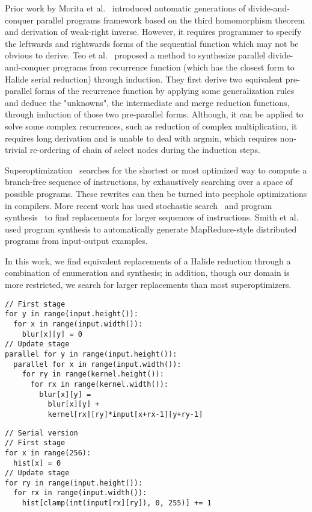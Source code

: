 Prior work by Morita et al.~\cite{Morita:2007:AIG:1250734.1250752} introduced automatic generations of divide-and-conquer parallel programs framework based on the third homomorphism theorem and derivation of weak-right inverse. However, it requires programmer to specify the leftwards and rightwards forms of the sequential function which may not be obvious to derive. Teo et al.~\cite{Teo:1997:DEP:266670.266697} proposed a method to synthesize parallel divide-and-conquer
programs from recurrence function (which has the closest form to Halide serial reduction) through induction. They first derive two equivalent pre-parallel forms of the recurrence function by applying some generalization rules and deduce the "unknowns", the intermediate and merge reduction functions, through induction of those two pre-parallel forms. Although, it can be applied to solve some complex recurrences, such as reduction of complex multiplication, it requires long derivation and is unable to deal with argmin, which requires non-trivial re-ordering of chain of select nodes during the induction steps. 

Superoptimization~\cite{Granlund:1992:EBU:143095.143146, Massalin:1987:SLS:36206.36194} searches for the shortest or most optimized way to compute a branch-free sequence of instructions, by exhaustively searching over a space of possible programs. These rewrites can then be turned into peephole optimizations in compilers. More recent work has used stochastic search~\cite{Phothilimthana:2016:SUS:2872362.2872387, Schkufza:2013:SS:2490301.2451150} and program synthesis~\cite{Lopes:2015:PCP:2737924.2737965} to find replacements for larger sequences of instructions. Smith et al.~\cite{Smith:2016:MPS:2908080.2908102} used program synthesis to automatically generate MapReduce-style distributed programs from input-output examples. 

In this work, we find equivalent replacements of a Halide reduction through a combination of enumeration and synthesis; in addition, though our domain is more restricted, we search for larger replacements than most superoptimizers.


\begin{lstlisting}[caption={Convolution blur kernel is easily parallelizable across \code{Var} $x$ adn $y$}, label={lst:blur_loopness}]
// First stage
for y in range(input.height()):
  for x in range(input.width()):
    blur[x][y] = 0
// Update stage
parallel for y in range(input.height()):
  parallel for x in range(input.width()):
    for ry in range(kernel.height()):
      for rx in range(kernel.width()):    
        blur[x][y] = 
          blur[x][y] + 
          kernel[rx][ry]*input[x+rx-1][y+ry-1] 
\end{lstlisting}

\begin{lstlisting}[caption={Histogram of an image is hard to parallelize since its update stage does not involve \code{RVar}s}, label={lst:histogram_loopness}]
// Serial version
// First stage
for x in range(256):
  hist[x] = 0
// Update stage
for ry in range(input.height()):
  for rx in range(input.width()):
    hist[clamp(int(input[rx][ry]), 0, 255)] += 1
\end{lstlisting}
